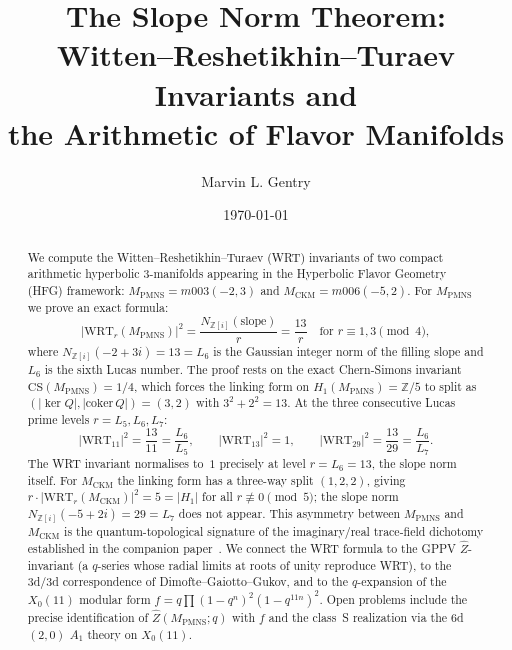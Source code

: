 \documentclass[11pt,a4paper]{article}
\theoremstyle{definition}
\newcommand{\MPMNS}{M_{\mathrm{PMNS}}}
\newcommand{\MCKM}{M_{\mathrm{CKM}}}
\newcommand{\Zfive}{\mathbb{Z}/5}
\newcommand{\Zi}{\mathbb{Z}[i]}
\newcommand{\WRT}{\mathrm{WRT}}
\newcommand{\CS}{\mathrm{CS}}
\begin{document}
\title{The Slope Norm Theorem:\\
Witten--Reshetikhin--Turaev Invariants and\\
the Arithmetic of Flavor Manifolds}

\author[1]{Marvin L. Gentry}
\date{\today}
\maketitle

\begin{abstract}
We compute the Witten--Reshetikhin--Turaev (WRT) invariants of two
compact arithmetic hyperbolic 3-manifolds appearing in the Hyperbolic
Flavor Geometry (HFG) framework: $\MPMNS = m003(-2,3)$ and
$\MCKM = m006(-5,2)$.
For $\MPMNS$ we prove an exact formula:
\begin{equation*}
|\WRT_r(\MPMNS)|^2 = \frac{N_{\Zi}(\text{slope})}{r}
= \frac{13}{r}
\quad\text{for } r \equiv 1,3 \pmod{4},
\end{equation*}
where $N_{\Zi}(-2+3i) = 13 = L_6$ is the Gaussian integer norm of
the filling slope and $L_6$ is the sixth Lucas number.
The proof rests on the exact Chern-Simons invariant
$\CS(\MPMNS) = 1/4$, which forces the linking form on
$H_1(\MPMNS) = \Zfive$ to split as $(|\ker Q|, |\mathrm{coker}\,Q|)
= (3,2)$ with $3^2+2^2 = 13$.
At the three consecutive Lucas prime levels $r = L_5, L_6, L_7$:
\[
|\WRT_{11}|^2 = \frac{13}{11} = \frac{L_6}{L_5},\qquad
|\WRT_{13}|^2 = 1,\qquad
|\WRT_{29}|^2 = \frac{13}{29} = \frac{L_6}{L_7}.
\]
The WRT invariant normalises to~$1$ precisely at level $r = L_6 = 13$,
the slope norm itself.
For $\MCKM$ the linking form has a three-way split $(1,2,2)$, giving
$r\cdot|\WRT_r(\MCKM)|^2 = 5 = |H_1|$ for all $r \not\equiv 0\pmod 5$;
the slope norm $N_{\Zi}(-5+2i) = 29 = L_7$ does not appear.
This asymmetry between $\MPMNS$ and $\MCKM$ is the quantum-topological
signature of the imaginary/real trace-field dichotomy established in
the companion paper~\cite{Gentry:X011}.
We connect the WRT formula to the GPPV $\hat{Z}$-invariant (a $q$-series
whose radial limits at roots of unity reproduce WRT), to the 3d/3d
correspondence of Dimofte--Gaiotto--Gukov, and to the $q$-expansion of the
$X_0(11)$ modular form $f = q\prod(1-q^n)^2(1-q^{11n})^2$.
Open problems include the precise identification of $\hat{Z}(\MPMNS;q)$
with $f$ and the class~S realization via the 6d $(2,0)$ $A_1$ theory on
$X_0(11)$.
\end{abstract}
\end{document}
